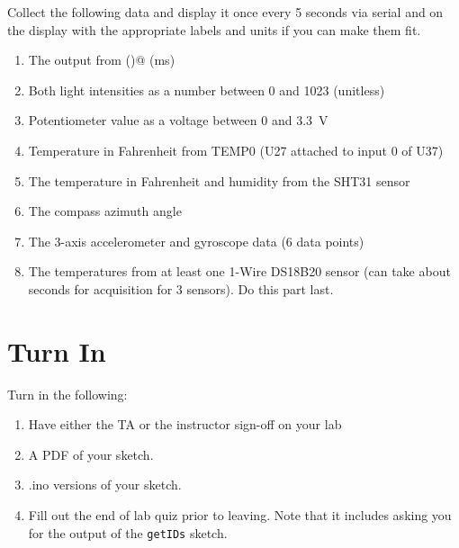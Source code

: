 Collect the following data and display it once every 5 seconds via serial and on 
the display with the appropriate labels and units if you can make them fit.
\begin{enumerate}
	\item The output from \lstinline@millis()@ (ms)
	\item Both light intensities as a number between 0 and 1023 (unitless)
	\item Potentiometer value as a voltage between 0 and 3.3~V
	\item Temperature in Fahrenheit from TEMP0 (U27 attached to input 0 of U37)
	\item The temperature in Fahrenheit and humidity from the SHT31 sensor
	\item The compass azimuth angle
	\item The 3-axis accelerometer and gyroscope data (6 data points)
 	\item The temperatures from at least one 1-Wire DS18B20 sensor (can take about
            seconds for acquisition for 3 sensors). Do this part last.
\end{enumerate}

\section{Turn In}
Turn in the following:
\begin{enumerate}
    \item Have either the TA or the instructor sign-off on your lab
    \item A PDF of your sketch.
    \item .ino versions of your sketch.
    \item Fill out the end of lab quiz prior to leaving. Note that it includes asking you 
            for the output of the \lstinline$getIDs$ sketch. 
\end{enumerate}

